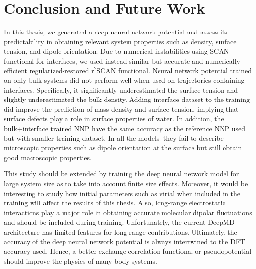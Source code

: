 \chapter{Conclusion and Future Work}

In this thesis, we generated a deep neural network potential and assess its
predictability in obtaining relevant system properties such as density, surface
tension, and dipole orientation. Due to numerical instabilities using SCAN functional for interfaces, we used instead  similar  but accurate and numerically efficient regularized-restored r$^2$SCAN functional. Neural network potential trained on only bulk
systems did not perform well when used on trajectories containing interfaces.
Specifically, it significantly underestimated the surface tension and
slightly underestimated the bulk density. Adding interface dataset to the training
did improve the prediction of mass density and surface tension, implying that surface defects
play a role in surface properties of water. In addition, the bulk+interface trained NNP have the same accuracy as the reference NNP used but with smaller training dataset. In all the models, they fail to describe microscopic properties such as dipole orientation at the surface but still obtain good macroscopic properties.

This study should be extended by training the deep neural network model for large system size as to take into account finite size effects. Moreover, it would be interesting to study how initial parameters such as virial when included in the training will affect the results of this thesis. Also, long-range electrostatic interactions play a major role in obtaining accurate molecular dipolar fluctuations and should be included during training. Unfortunately, the current DeepMD architecture has limited features for long-range contributions. Ultimately, the accuracy of the deep neural network potential is always intertwined to the DFT accuracy used. Hence, a better exchange-correlation functional or pseudopotential should improve the physics of many body systems.
